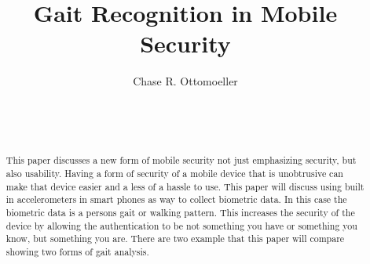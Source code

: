 \documentclass{sig-alternate}
\begin{document}

\title{Gait Recognition in Mobile Security}


\author{
\alignauthor
Chase R. Ottomoeller\\
	\\
	\\
	\\
}

\maketitle

\begin{abstract}
This paper discusses a new form of mobile security not just emphasizing security, but also usability. Having a form of security of a mobile device that is unobtrusive can make that device easier and a less of a hassle to use. This paper will discuss using built in accelerometers in smart phones as way to collect biometric data. In this case the biometric data is a persons gait or walking pattern. This increases the security of the device by allowing the authentication to be not something you have or something you know, but something you are. There are two example that this paper will compare showing two forms of gait analysis. 
\end{abstract}

\end{document}

